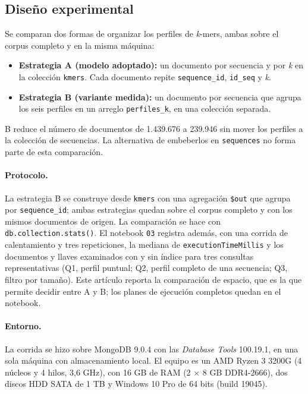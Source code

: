 \documentclass[journal]{IEEEtran}
\begin{document}
\subsection{Diseño experimental}
\label{sec:diseno_experimental}
Se comparan dos formas de organizar los perfiles de \textit{k}-mers, ambas sobre el corpus
completo y en la misma máquina:
\begin{itemize}
  \item \textbf{Estrategia A (modelo adoptado):} un documento por secuencia y por
        \textit{k} en la colección \texttt{kmers}. Cada documento repite
        \texttt{sequence\_id}, \texttt{id\_seq} y \textit{k}.
  \item \textbf{Estrategia B (variante medida):} un documento por secuencia que agrupa los
        seis perfiles en un arreglo \texttt{perfiles\_k}, en una colección separada.
\end{itemize}
B reduce el número de documentos de 1.439.676 a 239.946 sin mover los perfiles a la
colección de secuencias. La alternativa de embeberlos en \texttt{sequences} no forma parte
de esta comparación.

\paragraph*{Protocolo.}
La estrategia B se construye desde \texttt{kmers} con una agregación \texttt{\$out} que
agrupa por \texttt{sequence\_id}; ambas estrategias quedan sobre el corpus completo y con los
mismos documentos de origen. La comparación se hace con \texttt{db.collection.stats()}.
El notebook \texttt{03} registra además, con una corrida de calentamiento y tres
repeticiones, la mediana de \texttt{executionTimeMillis} y los documentos y llaves
examinados con y sin índice para tres consultas representativas (Q1, perfil puntual; Q2,
perfil completo de una secuencia; Q3, filtro por tamaño). Este artículo reporta la
comparación de espacio, que es la que permite decidir entre A y B; los planes de ejecución
completos quedan en el notebook.

\paragraph*{Entorno.}
La corrida se hizo sobre MongoDB 9.0.4 con las \textit{Database Tools} 100.19.1, en una
sola máquina con almacenamiento local. El equipo es un AMD Ryzen 3 3200G (4 núcleos y 4
hilos, 3,6 GHz), con 16 GB de RAM (2 $\times$ 8 GB DDR4-2666), dos discos HDD SATA de 1 TB
y Windows 10 Pro de 64 bits (build 19045).
\end{document}
